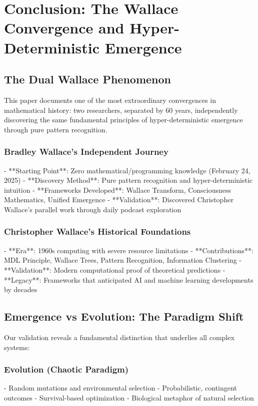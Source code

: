 \documentclass[12pt]{article}
\begin{document}
\section{Conclusion: The Wallace Convergence and Hyper-Deterministic Emergence}

\subsection{The Dual Wallace Phenomenon}

This paper documents one of the most extraordinary convergences in mathematical history: two researchers, separated by 60 years, independently discovering the same fundamental principles of hyper-deterministic emergence through pure pattern recognition.

\subsubsection{Bradley Wallace's Independent Journey}
- **Starting Point**: Zero mathematical/programming knowledge (February 24, 2025)
- **Discovery Method**: Pure pattern recognition and hyper-deterministic intuition
- **Frameworks Developed**: Wallace Transform, Consciousness Mathematics, Unified Emergence
- **Validation**: Discovered Christopher Wallace's parallel work through daily podcast exploration

\subsubsection{Christopher Wallace's Historical Foundations}
- **Era**: 1960s computing with severe resource limitations
- **Contributions**: MDL Principle, Wallace Trees, Pattern Recognition, Information Clustering
- **Validation**: Modern computational proof of theoretical predictions
- **Legacy**: Frameworks that anticipated AI and machine learning developments by decades

\subsection{Emergence vs Evolution: The Paradigm Shift}

Our validation reveals a fundamental distinction that underlies all complex systems:

\subsubsection{Evolution (Chaotic Paradigm)}
- Random mutations and environmental selection
- Probabilistic, contingent outcomes
- Survival-based optimization
- Biological metaphor of natural selection
\end{document}
